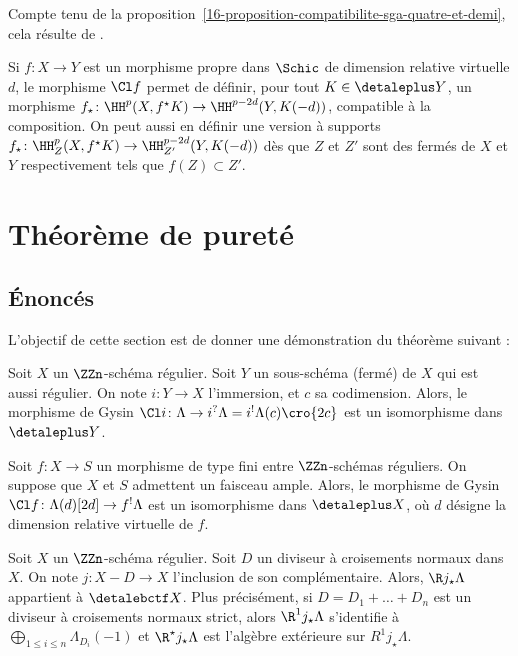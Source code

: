 \documentclass[10pt]{../fichiers-configuration-latex/smfart}
\begin{document}
Compte tenu de la
proposition~\ref{16-proposition-compatibilite-sga-quatre-et-demi}, cela
résulte de .

\begin{remarque2}
Si $f\colon X\to Y$ est un morphisme propre
dans $\Schic$ de dimension relative
virtuelle $d$, le morphisme $\Cl f$ permet de définir, pour tout $K\in
\detaleplus Y$, un morphisme $f_\star\colon \HH^{p}(X,f^\star K)\to
\HH^{p-2d}(Y,K(-d))$, compatible à la composition. On peut aussi en définir une
version à supports $f_\star\colon \HH^{p}_Z(X,f^\star K)\to
\HH^{p-2d}_{Z'}(Y,K(-d))$ dès que $Z$ et $Z'$ sont des fermés de
$X$ et $Y$ respectivement tels que $f(Z)\subset Z'$.
\end{remarque2}

\section{Théorème de pureté}%
\label{16-section-purete}
\subsection{Énoncés}%
L'objectif de cette section est de donner une démonstration
du théorème suivant :

\begin{theoreme2}\label{16-theoreme-purete-absolue}
Soit $X$ un $\ZZn$-schéma régulier. Soit $Y$ un sous-schéma (fermé)
de $X$ qui est aussi
régulier. On note $i\colon  Y\to X$ l'immersion, et $c$ sa codimension.
Alors, le morphisme de
Gysin $\Cl i\colon
\Lambda\to i^?\Lambda=i^!\Lambda(c)\cro{2c}$ est un isomorphisme dans
$\detaleplus Y$.
\end{theoreme2}

\begin{corollaire2}\label{16-corollaire-purete-absolue}
Soit $f\colon X\to S$ un morphisme de type fini entre $\ZZn$-schémas
réguliers. On suppose que $X$ et $S$ admettent un faisceau ample. Alors, le
morphisme de Gysin $\Cl f\colon \Lambda(d)[2d]\to f^!\Lambda$ est un
isomorphisme dans $\detaleplus X$, où $d$ désigne la dimension relative virtuelle
de $f$.
\end{corollaire2}

\begin{corollaire2}\label{16-corollaire-purete-absolue-dcn}
Soit $X$ un $\ZZn$-schéma régulier. Soit $D$ un diviseur à croisements
normaux dans $X$. On note $j\colon X-D\to X$ l'inclusion de son 
complémentaire. Alors, $\R j_\star \Lambda$ appartient à $\detalebctf X$.
Plus précisément, si $D=D_1+\dots+D_n$ est un diviseur à croisements
normaux strict, alors $\R^1 j_\star \Lambda$ s'identifie à $\bigoplus_{1\leq
i\leq n} \Lambda_{D_i}(-1)$ et $\R^\star j_\star \Lambda$ est l'algèbre
extérieure sur $R^1 j_\star \Lambda$.
\end{corollaire2}
\end{document}
